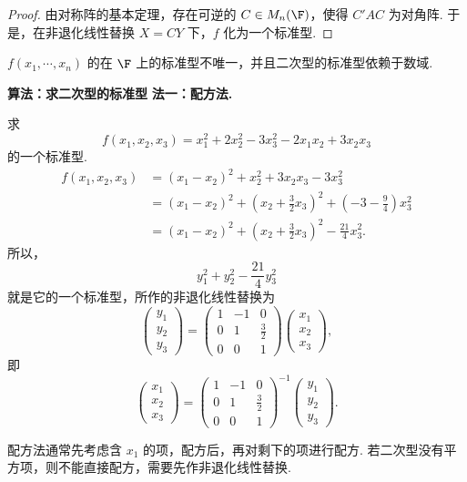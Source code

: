 \begin{proof}
	由对称阵的基本定理，存在可逆的 $C\in M_n(\F)$，使得 $C'AC$ 为对角阵. 于是，在非退化线性替换 $X=CY$ 下，$f$ 化为一个标准型.
\end{proof}


	$f(x_1,\cdots,x_n)$ 的在 $\F$ 上的标准型不唯一，并且二次型的标准型依赖于数域.


\noindent\textbf{算法：求二次型的标准型}
\noindent\textbf{法一：配方法.}

\begin{example}
	求
	\[
	f(x_1,x_2,x_3)=x_1^2+2x_2^2-3x_3^2-2x_1x_2+3x_2x_3
	\]
	的一个标准型.
	\[
	\begin{aligned}
		f(x_1,x_2,x_3)
		&=(x_1-x_2)^2+x_2^2+3x_2x_3-3x_3^2\\
		&=(x_1-x_2)^2+\left(x_2+\frac32x_3\right)^2+
		\left(-3-\frac94\right)x_3^2\\
		&=(x_1-x_2)^2+\left(x_2+\frac32x_3\right)^2-
		\frac{21}{4}x_3^2.
	\end{aligned}
	\]
	所以，
	\[
	y_1^2+y_2^2-\frac{21}{4}y_3^2
	\]
	就是它的一个标准型，所作的非退化线性替换为
	\[
	\begin{pmatrix}
		y_1\\y_2\\y_3
	\end{pmatrix}
	=
	\begin{pmatrix}
		1&-1&0\\
		0&1&\frac32\\
		0&0&1
	\end{pmatrix}
	\begin{pmatrix}
		x_1\\x_2\\x_3
	\end{pmatrix},
	\]
	即
	\[
	\begin{pmatrix}
		x_1\\x_2\\x_3
	\end{pmatrix}
	=
	\begin{pmatrix}
		1&-1&0\\
		0&1&\frac32\\
		0&0&1
	\end{pmatrix}^{-1}
	\begin{pmatrix}
		y_1\\y_2\\y_3
	\end{pmatrix}.
	\]
\end{example}

配方法通常先考虑含 $x_1$ 的项，配方后，再对剩下的项进行配方. 若二次型没有平方项，则不能直接配方，需要先作非退化线性替换.

